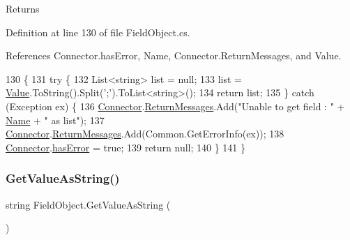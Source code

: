 \begin{DoxyReturn}{Returns}

\end{DoxyReturn}


Definition at line 130 of file Field\+Object.\+cs.



References Connector.\+has\+Error, Name, Connector.\+Return\+Messages, and Value.


\begin{DoxyCode}
130                                          \{
131         \textcolor{keywordflow}{try} \{
132             List<string> list = null;
133             list = \mbox{\hyperlink{class_field_object_a9764fb1824cec95b82cd6ac0b4cd8919}{Value}}.ToString().Split(\textcolor{charliteral}{';'}).ToList<\textcolor{keywordtype}{string}>();
134             \textcolor{keywordflow}{return} list;
135         \} \textcolor{keywordflow}{catch} (Exception ex) \{
136             \mbox{\hyperlink{class_connector}{Connector}}.\mbox{\hyperlink{class_connector_a1ed422674b344524fd77998dcf6a9ba6}{ReturnMessages}}.Add(\textcolor{stringliteral}{"Unable to get field : "} + 
      \mbox{\hyperlink{class_field_object_ae5d972e96a3eca93407da8e8a89abfd1}{Name}} + \textcolor{stringliteral}{" as list"});
137             \mbox{\hyperlink{class_connector}{Connector}}.\mbox{\hyperlink{class_connector_a1ed422674b344524fd77998dcf6a9ba6}{ReturnMessages}}.Add(Common.GetErrorInfo(ex));
138             \mbox{\hyperlink{class_connector}{Connector}}.\mbox{\hyperlink{class_connector_a079bae21a5417efa53bfe8954c0f533f}{hasError}} = \textcolor{keyword}{true};
139             \textcolor{keywordflow}{return} null;
140         \}
141      \}
\end{DoxyCode}
\mbox{\label{class_field_object_ad223b04d429de4b2c57838ffb41d124b}} 
\subsubsection{\texorpdfstring{Get\+Value\+As\+String()}{GetValueAsString()}}
{\footnotesize\ttfamily string Field\+Object.\+Get\+Value\+As\+String (\begin{DoxyParamCaption}{ }\end{DoxyParamCaption})}



